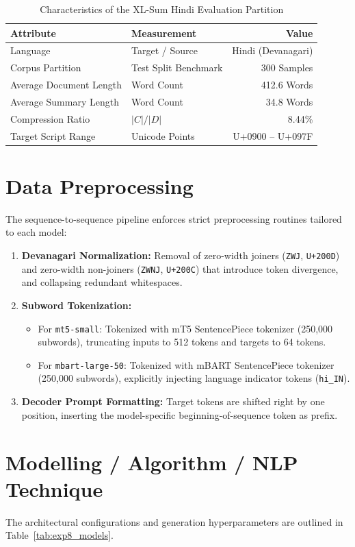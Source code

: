 \begin{table}[H]
\centering
\caption{Characteristics of the XL-Sum Hindi Evaluation Partition}
\label{tab:exp8_data_summary}
\begin{tabular}{llr}
\toprule
\textbf{Attribute} & \textbf{Measurement} & \textbf{Value} \\
\midrule
Language & Target / Source & Hindi (Devanagari) \\
Corpus Partition & Test Split Benchmark & 300 Samples \\
Average Document Length & Word Count & 412.6 Words \\
Average Summary Length & Word Count & 34.8 Words \\
Compression Ratio & $|C| / |D|$ & 8.44\% \\
Target Script Range & Unicode Points & U+0900 -- U+097F \\
\bottomrule
\end{tabular}
\end{table}

\section{Data Preprocessing}
The sequence-to-sequence pipeline enforces strict preprocessing routines tailored to each model:
\begin{enumerate}
    \item \textbf{Devanagari Normalization:} Removal of zero-width joiners (\texttt{ZWJ}, \texttt{U+200D}) and zero-width non-joiners (\texttt{ZWNJ}, \texttt{U+200C}) that introduce token divergence, and collapsing redundant whitespaces.
    \item \textbf{Subword Tokenization:}
    \begin{itemize}
        \item For \texttt{mt5-small}: Tokenized with mT5 SentencePiece tokenizer (250,000 subwords), truncating inputs to 512 tokens and targets to 64 tokens.
        \item For \texttt{mbart-large-50}: Tokenized with mBART SentencePiece tokenizer (250,000 subwords), explicitly injecting language indicator tokens (\texttt{hi\_IN}).
    \end{itemize}
    \item \textbf{Decoder Prompt Formatting:} Target tokens are shifted right by one position, inserting the model-specific beginning-of-sequence token as prefix.
\end{enumerate}

\section{Modelling / Algorithm / NLP Technique}
The architectural configurations and generation hyperparameters are outlined in Table~\ref{tab:exp8_models}.

